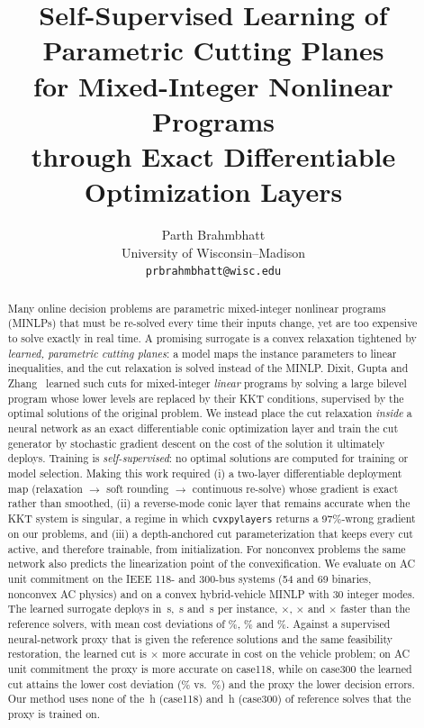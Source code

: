 \documentclass[10pt]{article}
\title{Self-Supervised Learning of Parametric Cutting Planes\\for Mixed-Integer Nonlinear Programs\\through Exact Differentiable Optimization Layers}
\author{Parth Brahmbhatt\\University of Wisconsin--Madison\\\texttt{prbrahmbhatt@wisc.edu}}
\date{}
\begin{document}
\maketitle

\begin{abstract}
Many online decision problems are parametric mixed-integer nonlinear programs (MINLPs) that must be re-solved every time their inputs change, yet are too expensive to solve exactly in real time.
A promising surrogate is a convex relaxation tightened by \emph{learned, parametric cutting planes}: a model maps the instance parameters to linear inequalities, and the cut relaxation is solved instead of the MINLP.
Dixit, Gupta and Zhang~\citep{dixit2025dfsm} learned such cuts for mixed-integer \emph{linear} programs by solving a large bilevel program whose lower levels are replaced by their KKT conditions, supervised by the optimal solutions of the original problem.
We instead place the cut relaxation \emph{inside} a neural network as an exact differentiable conic optimization layer and train the cut generator by stochastic gradient descent on the cost of the solution it ultimately deploys.
Training is \emph{self-supervised}: no optimal solutions are computed for training or model selection.
Making this work required (i) a two-layer differentiable deployment map (relaxation $\to$ soft rounding $\to$ continuous re-solve) whose gradient is exact rather than smoothed, (ii) a reverse-mode conic layer that remains accurate when the KKT system is singular, a regime in which \texttt{cvxpylayers} returns a 97\%-wrong gradient on our problems, and (iii) a depth-anchored cut parameterization that keeps every cut active, and therefore trainable, from initialization.
For nonconvex problems the same network also predicts the linearization point of the convexification.
We evaluate on AC unit commitment on the IEEE 118- and 300-bus systems (54 and 69 binaries, nonconvex AC physics) and on a convex hybrid-vehicle MINLP with 30 integer modes.
The learned surrogate deploys in \OURtimeA\,s, \OURtimeB\,s and \OURtimeV\,s per instance, \SPDA$\times$, \SPDB$\times$ and \SPDV$\times$ faster than the reference solvers, with mean cost deviations of \OURgapA\%, \OURgapB\% and \OURgapV\%.
Against a supervised neural-network proxy that is given the reference solutions and the same feasibility restoration, the learned cut is \VRATIO$\times$ more accurate in cost on the vehicle problem; on AC unit commitment the proxy is more accurate on case118, while on case300 the learned cut attains the lower cost deviation (\OURgapB\% vs.\ \PXgapB\%) and the proxy the lower decision errors. Our method uses none of the \LABELHA\,h (case118) and \LABELHB\,h (case300) of reference solves that the proxy is trained on.
\end{abstract}
\end{document}
